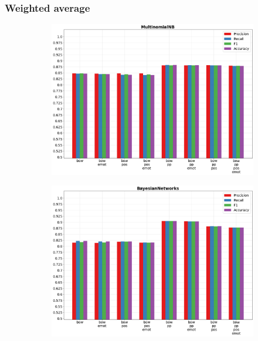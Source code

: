 \documentclass[oneside]{book}
\begin{document}
\subsubsection{Weighted average}
\vfill
\begin{figure}[!h]
	\hspace*{-3cm}
	\begin{subfigure}[b]{0.5\textwidth}
		\centering
		\includegraphics[width=10cm]{assets/reports/macro/bow/MultinomialNB.png}
	\end{subfigure}
	\hfill
	\begin{subfigure}[b]{0.5\textwidth}
		\centering
		\hspace*{0.15cm}
		\includegraphics[width=10cm]{assets/reports/macro/bow/BayesianNetworks.png}
	\end{subfigure}
\end{figure}
\vfill
\end{document}

